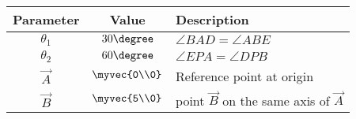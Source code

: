 \begin{tabular}{|c|c|p{5cm}|}
\hline
\textbf{Parameter} & \textbf{Value} & \textbf{Description} \\
\hline
$\theta_1$ & $30\degree$ & $\angle{BAD} = \angle{ABE}$ \\
\hline
$\theta_2$ & $60\degree$ & $\angle{EPA} = \angle{DPB}$ \\
\hline
	$\vec{A}$ & $\myvec{0\\0}$ & Reference point at origin \\
\hline
	$\vec{B}$ & $\myvec{5\\0}$ & point $\vec{B}$ on the same axis of $\vec{A}$ \\
\hline

\end{tabular}
